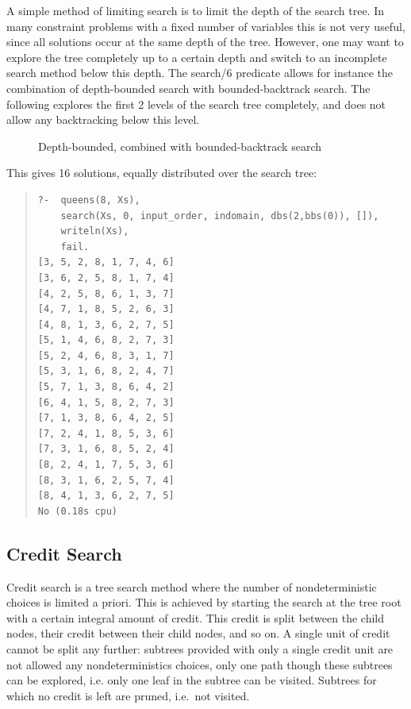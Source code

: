 A simple method of limiting search is to limit the depth of the search
tree. In many constraint problems with a fixed number of variables
this is not very useful, since all solutions occur at the same depth
of the tree. However, one may want to explore the tree completely
up to a certain depth and switch to an incomplete search method below this
depth. The search/6 predicate allows for instance the combination of
depth-bounded search with bounded-backtrack search. The following
explores the first 2 levels of the search tree completely, and does not
allow any backtracking below this level.
\begin{figure}
\begin{center}
\end{center}
\caption{Depth-bounded, combined with bounded-backtrack search}
\label{figdbsbbs}
\end{figure}
This gives 16 solutions, equally distributed over the search tree:
\begin{quote}\begin{verbatim}
?-  queens(8, Xs),
    search(Xs, 0, input_order, indomain, dbs(2,bbs(0)), []),
    writeln(Xs),
    fail.
[3, 5, 2, 8, 1, 7, 4, 6]
[3, 6, 2, 5, 8, 1, 7, 4]
[4, 2, 5, 8, 6, 1, 3, 7]
[4, 7, 1, 8, 5, 2, 6, 3]
[4, 8, 1, 3, 6, 2, 7, 5]
[5, 1, 4, 6, 8, 2, 7, 3]
[5, 2, 4, 6, 8, 3, 1, 7]
[5, 3, 1, 6, 8, 2, 4, 7]
[5, 7, 1, 3, 8, 6, 4, 2]
[6, 4, 1, 5, 8, 2, 7, 3]
[7, 1, 3, 8, 6, 4, 2, 5]
[7, 2, 4, 1, 8, 5, 3, 6]
[7, 3, 1, 6, 8, 5, 2, 4]
[8, 2, 4, 1, 7, 5, 3, 6]
[8, 3, 1, 6, 2, 5, 7, 4]
[8, 4, 1, 3, 6, 2, 7, 5]
No (0.18s cpu)
\end{verbatim}\end{quote}


\subsection{Credit Search}

Credit search\cite{beldiceanu:credit}
is a tree search method where the number of
nondeterministic choices is limited a priori.  This is achieved by
starting the search at the tree root with a certain integral amount of
credit.  This credit is split between the child nodes, their credit
between their child nodes, and so on.  A single unit of credit cannot
be split any further: subtrees provided with only a single credit unit
are not allowed any nondeterministics choices, only one path though these
subtrees can be explored, i.e. only one leaf in the subtree can be visited.
Subtrees for which no credit is left are pruned,
i.e.\ not visited.

